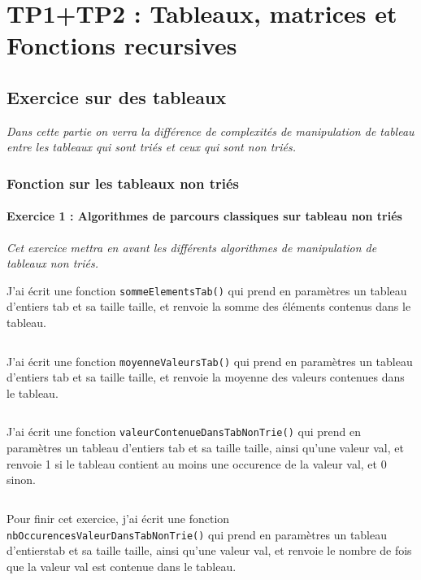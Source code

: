 \chapter{TP1+TP2 : Tableaux, matrices et Fonctions recursives}

\section{Exercice sur des tableaux}
\textit{Dans cette partie on verra la différence de complexités de manipulation de tableau entre les tableaux qui sont triés et ceux qui sont non triés.}

\subsection{Fonction sur les tableaux non triés}

\subsubsection{Exercice 1 : Algorithmes de parcours classiques sur tableau non triés}
\textit{Cet exercice mettra en avant les différents algorithmes de manipulation de tableaux non triés.}

J'ai écrit une fonction \texttt{sommeElementsTab()} qui prend en paramètres un tableau d’entiers tab et sa taille taille, et renvoie la somme des éléments contenus dans le tableau.
\inputminted[linenos,firstline=7, lastline=14]{cpp}{../sources/cpp/TP1-2/manipTableauxNonTries.c}

J'ai écrit une fonction \texttt{moyenneValeursTab()} qui prend en paramètres un tableau d’entiers tab et sa taille taille, et renvoie la moyenne des valeurs contenues dans le tableau.
\inputminted[linenos,firstline=16, lastline=18]{cpp}{../sources/cpp/TP1-2/manipTableauxNonTries.c}

J'ai écrit une fonction \texttt{valeurContenueDansTabNonTrie()} qui prend en paramètres un tableau d’entiers tab et sa taille taille, ainsi qu’une valeur val, et renvoie 1 si le tableau contient au moins une occurence de la valeur val, et 0 sinon.
\inputminted[linenos,firstline=20, lastline=28]{cpp}{../sources/cpp/TP1-2/manipTableauxNonTries.c}

Pour finir cet exercice, j'ai écrit une fonction \texttt{nbOccurencesValeurDansTabNonTrie()} qui prend en paramètres un tableau d’entierstab et sa taille taille, ainsi qu’une valeur val, et renvoie le nombre de fois que la valeur val est contenue dans le tableau.
\inputminted[linenos,firstline=30, lastline=37]{cpp}{../sources/cpp/TP1-2/manipTableauxNonTries.c}

